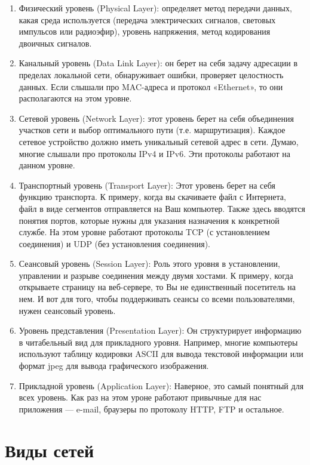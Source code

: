 \begin{enumerate}
	\item Физический уровень (Physical Layer): определяет метод передачи данных, какая среда используется (передача электрических сигналов, световых импульсов или радиоэфир), уровень напряжения, метод кодирования
	двоичных сигналов.

	\item Канальный уровень (Data Link Layer): он берет на себя задачу адресации в пределах локальной сети, обнаруживает ошибки, проверяет целостность данных. Если слышали про MAC-адреса и протокол «Ethernet», то
	они располагаются на этом уровне.
	\item Сетевой уровень (Network Layer): этот уровень берет на себя объединения участков сети и выбор оптимального пути (т.е. маршрутизация). Каждое сетевое устройство должно иметь уникальный сетевой адрес в сети.
	Думаю, многие слышали про протоколы IPv4 и IPv6. Эти протоколы работают на данном уровне.
	\item Транспортный уровень (Transport Layer): Этот уровень берет на себя
	функцию транспорта. К примеру, когда вы скачиваете файл с Интернета,
	файл в виде сегментов отправляется на Ваш компьютер. Также здесь вводятся понятия портов, которые нужны для указания назначения к конкретной службе. На этом уровне работают протоколы TCP (с установлением соединения) и UDP (без установления соединения).
	\item Сеансовый уровень (Session Layer): Роль этого уровня в установлении,
	управлении и разрыве соединения между двумя хостами. К примеру,
	когда открываете страницу на веб-сервере, то Вы не единственный посетитель на нем. И вот для того, чтобы поддерживать сеансы со всеми пользователями, нужен сеансовый уровень.
	\item Уровень представления (Presentation Layer): Он структурирует
	информацию в читабельный вид для прикладного уровня. Например,
	многие компьютеры используют таблицу кодировки ASCII для вывода
	текстовой информации или формат jpeg для вывода графического изображения.

	\item Прикладной уровень (Application Layer): Наверное, это самый понятный для всех уровень. Как раз на этом уроне работают привычные для
	нас приложения — e-mail, браузеры по протоколу HTTP, FTP и остальное.
\end{enumerate}

\section{Виды сетей}

